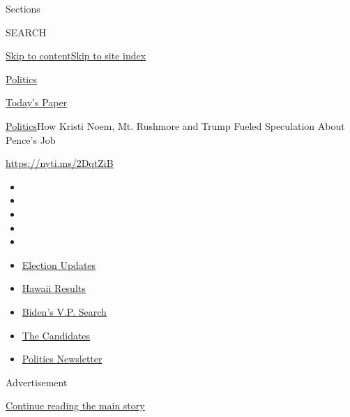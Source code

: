 Sections

SEARCH

\protect\hyperlink{site-content}{Skip to
content}\protect\hyperlink{site-index}{Skip to site index}

\href{https://www.nytimes.com/section/politics}{Politics}

\href{https://myaccount.nytimes.com/auth/login?response_type=cookie\&client_id=vi}{}

\href{https://www.nytimes.com/section/todayspaper}{Today's Paper}

\href{/section/politics}{Politics}\textbar{}How Kristi Noem, Mt.
Rushmore and Trump Fueled Speculation About Pence's Job

\href{https://nyti.ms/2DqtZiB}{https://nyti.ms/2DqtZiB}

\begin{itemize}
\item
\item
\item
\item
\item
\end{itemize}

\begin{itemize}
\item
  \href{https://www.nytimes.com/2020/08/07/us/elections/biden-vs-trump.html?action=click\&pgtype=Article\&state=default\&region=TOP_BANNER\&context=storylines_menu}{Election
  Updates}
\item
  \href{https://www.nytimes.com/interactive/2020/08/08/us/elections/results-hawaii-primary-elections.html?action=click\&pgtype=Article\&state=default\&region=TOP_BANNER\&context=storylines_menu}{Hawaii
  Results}
\item
  \href{https://www.nytimes.com/article/biden-vice-president-2020.html?action=click\&pgtype=Article\&state=default\&region=TOP_BANNER\&context=storylines_menu}{Biden's
  V.P. Search}
\item
  \href{https://www.nytimes.com/interactive/2019/us/politics/2020-presidential-candidates.html?action=click\&pgtype=Article\&state=default\&region=TOP_BANNER\&context=storylines_menu}{The
  Candidates}
\item
  \href{https://www.nytimes.com/newsletters/politics?action=click\&pgtype=Article\&state=default\&region=TOP_BANNER\&context=storylines_menu}{Politics
  Newsletter}
\end{itemize}

Advertisement

\protect\hyperlink{after-top}{Continue reading the main story}

